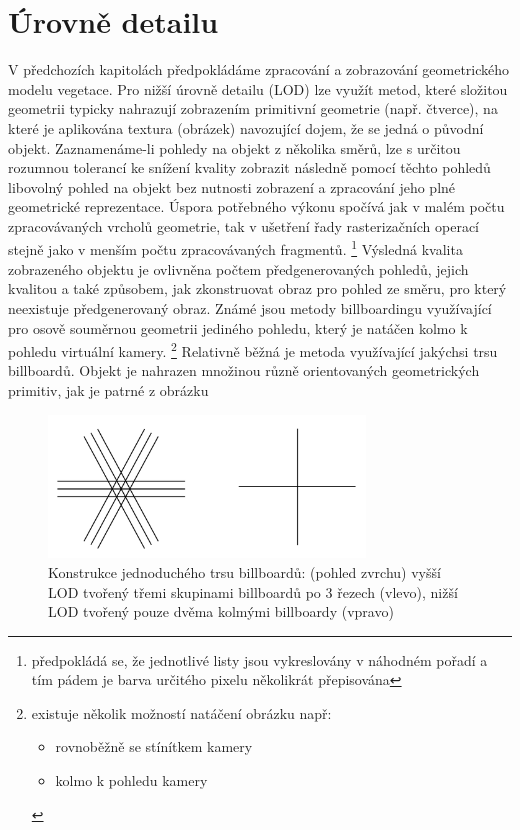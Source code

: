 \section{Úrovně detailu}
\label{sec-LOD}
V předchozích kapitolách předpokládáme zpracování a zobrazování geometrického modelu vegetace. Pro nižší úrovně detailu (LOD) lze využít metod, které složitou geometrii typicky nahrazují zobrazením primitivní geometrie (např. čtverce), na které je aplikována textura (obrázek) navozující dojem, že se jedná o původní objekt. Zaznamenáme-li pohledy na objekt z několika směrů, lze s určitou rozumnou tolerancí ke snížení kvality zobrazit následně pomocí těchto pohledů libovolný pohled na objekt bez nutnosti zobrazení a zpracování jeho plné geometrické reprezentace. Úspora potřebného výkonu spočívá jak v malém počtu zpracovávaných vrcholů geometrie, tak v ušetření řady rasterizačních operací stejně jako v menším počtu zpracovávaných fragmentů.
\footnote{ předpokládá se, že jednotlivé listy jsou vykreslovány v náhodném pořadí a tím pádem je barva určitého pixelu několikrát přepisována}
 Výsledná kvalita zobrazeného objektu je ovlivněna počtem předgenerovaných pohledů, jejich kvalitou a také způsobem, jak zkonstruovat obraz pro pohled ze směru, pro který neexistuje předgenerovaný obraz.
Známé jsou metody billboardingu využívající pro osově souměrnou geometrii jediného pohledu, který je natáčen kolmo k pohledu virtuální kamery. \footnote{existuje několik možností natáčení obrázku např:
\begin{itemize}
\item rovnoběžně se stínítkem kamery
\item kolmo k pohledu kamery
\end{itemize}
}
Relativně běžná je metoda využívající jakýchsi trsu billboardů. Objekt je nahrazen množinou různě orientovaných geometrických primitiv, jak je patrné z obrázku 
\begin{figure}[!hbt]
\begin{center}
\includegraphics[width=0.75\textwidth]{./figures/slicesTop.png}
\caption{ Konstrukce jednoduchého trsu billboardů: (pohled zvrchu) vyšší LOD tvořený třemi skupinami billboardů po 3 řezech (vlevo), nižší LOD tvořený pouze dvěma kolmými billboardy (vpravo) }
\end{center}
\label{fig:sliceBilboard}
\end{figure}

